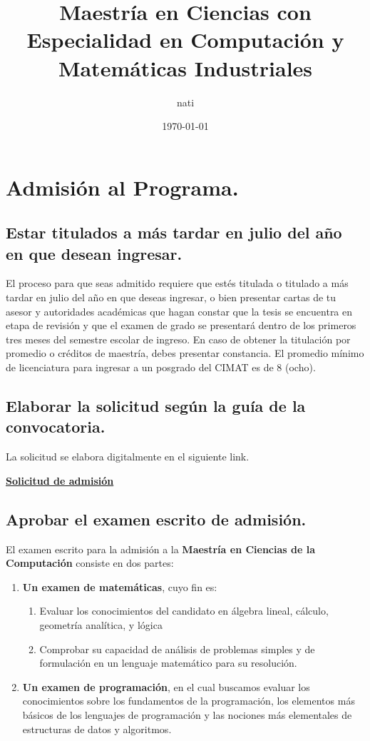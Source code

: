 \documentclass[10pt,a4paper]{book}
\author{nati}
\title{\textbf{Maestría en Ciencias con Especialidad en Computación y Matemáticas Industriales}}
\date{\today}
\begin{document}
\maketitle
\newpage
\tableofcontents
\chapter{Admisión al Programa.}
\section{Estar titulados a más tardar en julio del año en que desean ingresar.}

El proceso para que seas admitido requiere que estés titulada o titulado a más tardar en julio del año en que deseas ingresar, o bien presentar cartas de tu asesor y autoridades académicas que hagan constar que la tesis se encuentra en etapa de revisión y que el examen de grado se presentará dentro de los primeros tres meses del semestre escolar de ingreso.
En caso de obtener la titulación por promedio o créditos de maestría, debes presentar constancia. El promedio mínimo de licenciatura para ingresar a un posgrado del CIMAT es de 8 (ocho).

\section{Elaborar la solicitud según la guía de la convocatoria.}

La solicitud se elabora digitalmente en el siguiente link.

\href{https://posgrados.cimat.mx/ControlEscolar/web/Admisiones/SolicitudAdmision}{\textbf{Solicitud de admisión}}

\section{Aprobar el examen escrito de admisión.}

El examen escrito para la admisión a la \textbf{Maestría en Ciencias de la Computación} consiste en dos partes:
\begin{enumerate}
	\item \textbf{Un examen de matemáticas}, cuyo fin es:
	\begin{enumerate}
		\item Evaluar los conocimientos del candidato en álgebra lineal, cálculo, geometría analítica, y lógica
		\item Comprobar su capacidad de análisis de problemas simples y de formulación en un lenguaje matemático para su resolución. 
	\end{enumerate}
	\item \textbf{Un examen de programación}, en el cual buscamos evaluar los conocimientos sobre los fundamentos de la programación, los elementos más básicos de los lenguajes de programación y las nociones más elementales de estructuras de datos y algoritmos.
\end{enumerate}
\end{document}
